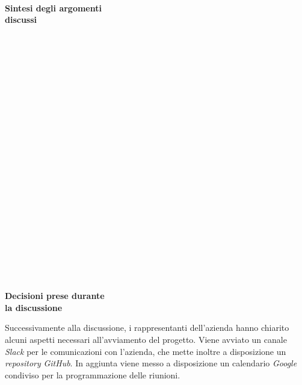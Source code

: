\documentclass[10pt, a4paper]{article}
\title{\data}
\author{SWEetCode}
\begin{document}


\setlength{\columnsep}{2.2em}
\setlength{\columnseprule}{4pt}
\begin{paracol}{2}


\intestazione
\vspace{5.0em}

\partecipanti

\newpage

\switchcolumn
\revisioneAzioni
\vspace{23.5em}

\ordineGiorno

\newpage


\switchcolumn

\\
\textbf{Sintesi degli argomenti\\discussi}

~\newpage
~ \\\\\\\\\\\\\\\\\\\\\\\\\\\\\\\\\\\\\\~

\\
\textbf{Decisioni prese durante\\la discussione}

\switchcolumn

\discussione
Successivamente alla discussione, i rappresentanti dell'azienda hanno chiarito alcuni aspetti necessari all'avviamento del progetto. Viene avviato un canale \textit{Slack} per le comunicazioni con l'azienda, che mette inoltre a disposizione un \textit{repository} \textit{GitHub}. In aggiunta viene messo a disposizione un calendario \textit{Google} condiviso per la programmazione delle riunioni.


\end{paracol}
\end{document}
